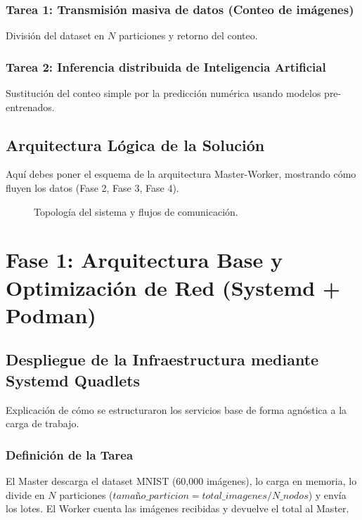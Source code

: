 \documentclass[11pt, a4paper]{report}
\begin{document}
\subsection{Tarea 1: Transmisión masiva de datos (Conteo de imágenes)}
División del dataset en $N$ particiones y retorno del conteo.
\subsection{Tarea 2: Inferencia distribuida de Inteligencia Artificial}
Sustitución del conteo simple por la predicción numérica usando modelos pre-entrenados.

\section{Arquitectura Lógica de la Solución}
Aquí debes poner el esquema de la arquitectura Master-Worker, mostrando cómo fluyen los datos (Fase 2, Fase 3, Fase 4).

\begin{figure}[htbp]
  \centering
  \caption{Topología del sistema y flujos de comunicación.}
  \label{fig:arquitectura}
\end{figure}

\chapter{Fase 1: Arquitectura Base y Optimización de Red (Systemd + Podman)}

\section{Despliegue de la Infraestructura mediante Systemd Quadlets}
Explicación de cómo se estructuraron los servicios base de forma agnóstica a la carga de trabajo.

\subsection*{Definición de la Tarea}
El Master descarga el dataset MNIST (60,000 imágenes), lo carga en memoria, lo divide en $N$ particiones ($tamaño\_particion = total\_imagenes / N\_nodos$) y envía los lotes. El Worker cuenta las imágenes recibidas y devuelve el total al Master.
\end{document}
